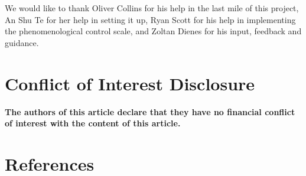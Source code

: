 \documentclass[
  man,
  floatsintext,
  longtable,
  nolmodern,
  notxfonts,
  notimes,
  colorlinks=true,linkcolor=blue,citecolor=blue,urlcolor=blue]{apa7}
\begin{document}
We would like to thank Oliver Collins for his help in the last mile of
this project, An Shu Te for her help in setting it up, Ryan Scott for
his help in implementing the phenomenological control scale, and Zoltan
Dienes for his input, feedback and guidance.

\section{Conflict of Interest
Disclosure}\label{conflict-of-interest-disclosure}

\textbf{The authors of this article declare that they have no financial
conflict of interest with the content of this article.}

\pagebreak

\section{References}\label{references}
\end{document}
